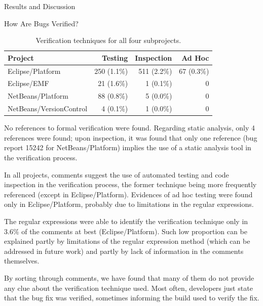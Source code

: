 \begin{section}{Results and Discussion}
\begin{subsection}{How Are Bugs Verified?}
	\begin{table}
		\begin{center}
		\caption{Verification techniques for all four subprojects.} \label{tab:how}
		\begin{tabular}{l|r|r|r}
			\textbf{\centering Project} & 
			\textbf{\centering Testing} & 
			\textbf{\centering Inspection} & 
			\textbf{\centering Ad Hoc} \\
			\hline
			Eclipse/Platform        & 250 (1.1\%) & 511 (2.2\%) & 67 (0.3\%) \\
			Eclipse/EMF             & 21 (1.6\%) & 1 (0.1\%) & 0 \hspace{0.8cm} \\
			NetBeans/Platform       & 88 (0.8\%) & 5 (0.0\%) & 0 \hspace{0.8cm} \\
			NetBeans/VersionControl & 4 (0.1\%) & 1 (0.0\%) & 0 \hspace{0.8cm}
		\end{tabular}
		\end{center}
	\end{table}

	No references to formal verification were found. Regarding static analysis, only 4 references were found; upon inspection, it was found that only one reference (bug report 15242 for NetBeans/Platform) implies the use of a static analysis tool in the verification process.

	In all projects, comments suggest the use of automated testing and code inspection in the verification process, the former technique being more frequently referenced (except in Eclipse/Platform). Evidences of ad hoc testing were found only in Eclipse/Platform, probably due to limitations in the regular expressions.

	The regular expressions were able to identify the verification technique only in 3.6\% of the comments at best (Eclipse/Platform). Such low proportion can be explained partly by limitations of the regular expression method (which can be addressed in future work) and partly by lack of information in the comments themselves.
	
	By sorting through comments, we have found that many of them do not provide any clue about the verification technique used. Most often, developers just state that the bug fix was verified, sometimes informing the build used to verify the fix. 
	

\end{subsection}
\end{section}

